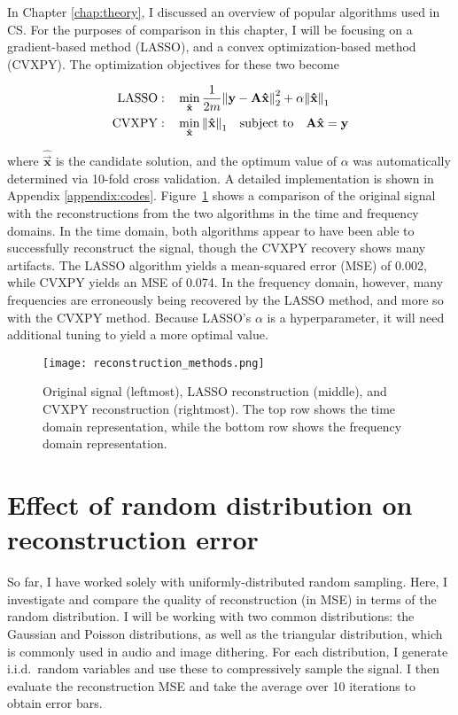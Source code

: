 In Chapter \ref{chap:theory}, I discussed an overview of popular algorithms used in CS. For the purposes of comparison in this chapter, I will be focusing on a gradient-based method (LASSO), and a convex optimization-based method (CVXPY). The optimization objectives for these two become

\begin{align}
	\mathrm{LASSO}:& \quad \min_{\bm\hat{\text{\bfseries x}}} \frac{1}{2m} \norm{\text{\bfseries y} - \text{\bfseries A}\bm\hat{\text{\bfseries x}}}_2^2 + \alpha \norm{\bm\hat{\text{\bfseries x}}}_1 \label{eq:random-lasso-objective} \\
	\mathrm{CVXPY}:& \quad \min_{\bm\hat{\text{\bfseries x}}} \norm{\bm\hat{\text{\bfseries x}}}_1 \quad \textrm{subject to} \quad \text{\bfseries A}\bm\hat{\text{\bfseries x}} = \text{\bfseries y} \label{eq:random-cvxpy-objective}
\end{align}

\noindent where $\bm\hat{\vec{x}}$ is the candidate solution, and the optimum value of $\alpha$ was automatically determined via 10-fold cross validation. A detailed implementation is shown in Appendix \ref{appendix:codes}. Figure~\ref{fig:random-compare-algorithms} shows a comparison of the original signal with the reconstructions from the two algorithms in the time and frequency domains. In the time domain, both algorithms appear to have been able to successfully reconstruct the signal, though the CVXPY recovery shows many artifacts. The LASSO algorithm yields a mean-squared error (MSE) of 0.002, while CVXPY yields an MSE of 0.074. In the frequency domain, however, many frequencies are erroneously being recovered by the LASSO method, and more so with the CVXPY method. Because LASSO's $\alpha$ is a hyperparameter, it will need additional tuning to yield a more optimal value.

\begin{figure}[htb]
	\texttt{[image: reconstruction\_methods.png]}
	\caption{Original signal (leftmost), LASSO reconstruction (middle), and CVXPY reconstruction (rightmost). The top row shows the time domain representation, while the bottom row shows the frequency domain representation.}
	\label{fig:random-compare-algorithms}
\end{figure}


\section{Effect of random distribution on reconstruction error}
\label{sec:random-distro}
So far, I have worked solely with uniformly-distributed random sampling. Here, I investigate and compare the quality of reconstruction (in MSE) in terms of the random distribution. I will be working with two common distributions: the Gaussian and Poisson distributions, as well as the triangular distribution, which is commonly used in audio and image dithering. For each distribution, I generate i.i.d.~random variables and use these to compressively sample the signal. I then evaluate the reconstruction MSE and take the average over 10 iterations to obtain error bars.

